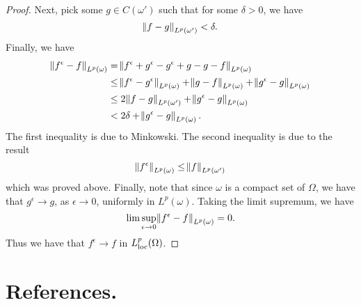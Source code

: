 \documentclass[10pt]{article}
\begin{document}
\begin{proof}
	Next, pick some $g \in C(\omega')$ such that for some $\delta > 0$, we have 
	\begin{equation*}
		\displaystyle \norm{f - g}_{L^p(\omega')} < \delta.
	\end{equation*}
	Finally, we have
	\begin{align*}
		\displaystyle \norm{f^\epsilon - f}_{L^p(\omega)} &= \norm{f^\epsilon + g^\epsilon - g^\epsilon + g - g - f}_{L^p(\omega)} \\
		&\leq \norm{f^\epsilon - g^\epsilon}_{L^p(\omega)} + \norm{g - f}_{L^p(\omega)} + \norm{g^\epsilon - g}_{L^p(\omega)} \\
		&\leq 2\norm{f-g}_{L^p(\omega')} + \norm{g^\epsilon - g}_{L^p(\omega)} \\
		&< 2\delta + \norm{g^\epsilon - g}_{L^p(\omega)}.
	\end{align*}
	The first inequality is due to Minkowski. The second inequality is due to the result 
	\begin{equation*}
		\displaystyle \norm{f^\epsilon}_{L^p(\omega)} \leq \norm{f}_{L^p(\omega')}
	\end{equation*}
	which was proved above. Finally, note that since $\omega$ is a compact set of $\Omega$, we have that $g^\epsilon \to g$, as $\epsilon \to 0$, uniformly in $L^p(\omega)$. Taking the limit supremum, we have 
	\begin{equation*}
		\displaystyle \lim\sup\limits_{\epsilon \to 0}{\norm{f^\epsilon - f}_{L^p(\omega)}} = 0.
	\end{equation*}
	Thus we have that $f^\epsilon \to f$ in $L_{\operatorname{loc}}^p(\Omega)$. 
\end{proof}
\section{References.}
\end{document}
